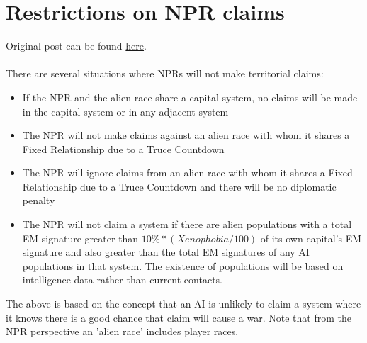 \documentclass[../../Aurora C# unofficial manual.tex]{subfiles}
\begin{document}
	\section{Restrictions on NPR claims}\label{5_restriction_on_npr_claimes}
	Original post can be found
	\href{http://aurora2.pentarch.org/index.php?topic=8495.msg118404#msg118404}{here}.
	\\\\
	There are several situations where NPRs will not make territorial claims:
	\begin{itemize}
		\item If the NPR and the alien race share a capital system, no claims will be made in the capital system or in any adjacent system
		\item The NPR will not make claims against an alien race with whom it shares a Fixed Relationship due to a Truce Countdown
		\item The NPR will ignore claims from an alien race with whom it shares a Fixed Relationship due to a Truce Countdown and there will be no diplomatic penalty
		\item The NPR will not claim a system if there are alien populations with a total EM signature greater than \( 10\% * (Xenophobia / 100) \) of its own capital's EM signature and also greater than the total EM signatures of any AI populations in that system. The existence of populations will be based on intelligence data rather than current contacts.
	\end{itemize}
	The above is based on the concept that an AI is unlikely to claim a system where it knows there is a good chance that claim will cause a war. Note that from the NPR perspective an 'alien race' includes player races.
\end{document}
